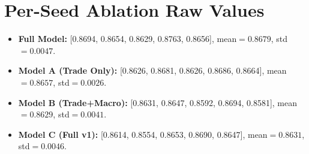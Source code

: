 \documentclass[conference]{IEEEtran}
\begin{document}
\section{Per-Seed Ablation Raw Values}
\begin{itemize}
\item \textbf{Full Model:} [0.8694, 0.8654, 0.8629, 0.8763, 0.8656],
mean$=0.8679$, std$=0.0047$.
\item \textbf{Model A (Trade Only):} [0.8626, 0.8681, 0.8626, 0.8686,
0.8664], mean$=0.8657$, std$=0.0026$.
\item \textbf{Model B (Trade+Macro):} [0.8631, 0.8647, 0.8592, 0.8694,
0.8581], mean$=0.8629$, std$=0.0041$.
\item \textbf{Model C (Full v1):} [0.8614, 0.8554, 0.8653, 0.8690,
0.8647], mean$=0.8631$, std$=0.0046$.
\end{itemize}
\end{document}
